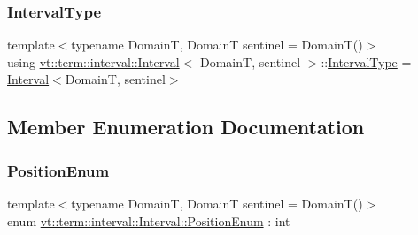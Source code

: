 \mbox{\label{structvt_1_1term_1_1interval_1_1_interval_a183b53c7344a9aa51c026dfe71b57ad4}} 
\subsubsection{\texorpdfstring{Interval\+Type}{IntervalType}}
{\footnotesize\ttfamily template$<$typename DomainT, DomainT sentinel = Domain\+T()$>$ \\
using \hyperlink{structvt_1_1term_1_1interval_1_1_interval}{vt\+::term\+::interval\+::\+Interval}$<$ DomainT, sentinel $>$\+::\hyperlink{structvt_1_1term_1_1interval_1_1_interval_a183b53c7344a9aa51c026dfe71b57ad4}{Interval\+Type} =  \hyperlink{structvt_1_1term_1_1interval_1_1_interval}{Interval}$<$DomainT, sentinel$>$}



\subsection{Member Enumeration Documentation}
\mbox{\label{structvt_1_1term_1_1interval_1_1_interval_adfdde0c1b12f536189432b168f6df6b3}} 
\subsubsection{\texorpdfstring{Position\+Enum}{PositionEnum}}
{\footnotesize\ttfamily template$<$typename DomainT, DomainT sentinel = Domain\+T()$>$ \\
enum \hyperlink{structvt_1_1term_1_1interval_1_1_interval_adfdde0c1b12f536189432b168f6df6b3}{vt\+::term\+::interval\+::\+Interval\+::\+Position\+Enum} \+: int\hspace{0.3cm}{\ttfamily [strong]}}

